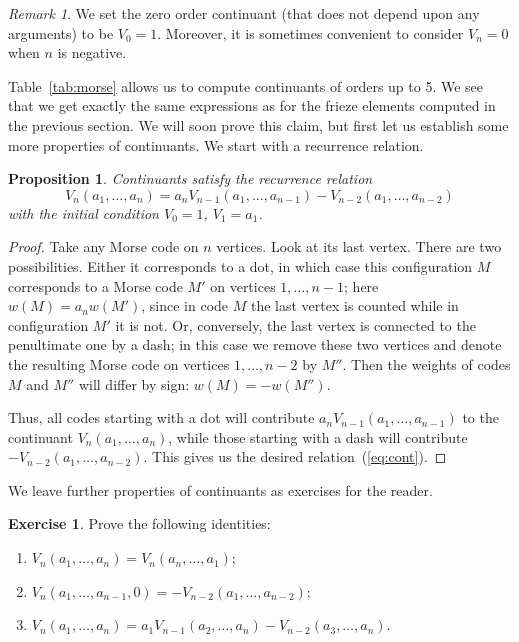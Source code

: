 \documentclass[a4paper,11pt]{amsart}
\theoremstyle{plain}
\newtheorem{prop}[theorem]{Proposition}
\theoremstyle{remark}
\newtheorem{remark}[theorem]{Remark}
\theoremstyle{definition}
\newtheorem{exercise}[theorem]{Exercise}
\numberwithin{equation}{section}
\numberwithin{figure}{section}
\begin{document}
\begin{remark}
We set the zero order continuant (that does not depend upon any arguments) to be $V_0=1$. Moreover, it is sometimes convenient to consider $V_n=0$ when $n$ is negative.
\end{remark}

Table~\ref{tab:morse} allows us to compute continuants of orders up to 5. We see that we get exactly the same expressions as for the frieze elements computed in the previous section. We will soon prove this claim, but first let us establish some more properties of continuants. We  start with a recurrence relation.

\begin{prop}\label{prop:contrecurrence}
Continuants satisfy the recurrence relation
\begin{equation}\label{eq:cont}
V_n(a_1,\dots,a_n)=a_nV_{n-1}(a_1,\dots,a_{n-1})-V_{n-2}(a_1,\dots,a_{n-2})
\end{equation}
with the initial condition $V_0=1$, $V_1=a_1$.
\end{prop}


\begin{proof}
Take any Morse code on $n$ vertices. Look at its last vertex. There are two possibilities. Either it corresponds to a dot, in which case this configuration $M$ corresponds to a Morse code $M'$ on vertices $1,\dots,{n-1}$; here $w(M)=a_nw(M')$, since in code $M$ the last vertex is counted while in configuration $M'$ it is not. Or, conversely, the last vertex is connected to the penultimate one by a dash; in this case we remove these two vertices and denote the resulting Morse code on vertices $1,\dots,n-2$ by $M''$. Then the weights of codes $M$ and $M''$ will differ by sign: $w(M)=-w(M'')$.

Thus, all codes starting with a dot will contribute $a_nV_{n-1}(a_1,\dots,a_{n-1})$ to the continuant $V_n(a_1,\dots,a_n)$, while those starting with a dash will contribute $-V_{n-2}(a_1,\dots,a_{n-2})$. This gives us the desired relation~(\ref{eq:cont}).
\end{proof}

We leave further properties of continuants as exercises for the reader.

\begin{exercise}\label{ex:continuant} Prove the following identities:
\begin{enumerate}
    \item $V_n(a_1,\dots,a_n)=V_n(a_n,\dots,a_1)$;
    \item $V_n(a_1,\dots,a_{n-1},0)=-V_{n-2}(a_1,\dots,a_{n-2})$;
    \item $V_n(a_1,\dots,a_n)=a_1V_{n-1}(a_2,\dots,a_{n})- V_{n-2}(a_3,\dots,a_{n})$.
\end{enumerate}
\end{exercise}
\end{document}
